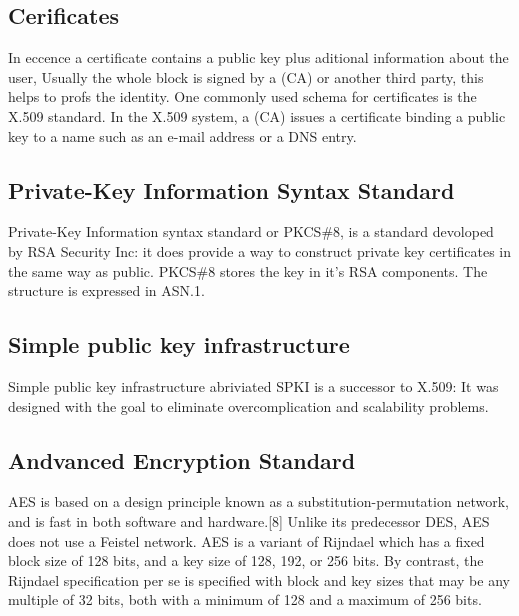\subsection{Cerificates} %
In eccence a certificate contains a public key plus aditional information about the user,
Usually the whole block is signed by a (CA) or another third party, this helps to profs the identity. One commonly used schema for certificates is the X.509 standard.
In the X.509 system, a (CA) issues a certificate binding a public key to a name such as an e-mail address or a DNS entry.

\subsection{Private-Key Information Syntax Standard}
Private-Key Information syntax standard or PKCS\#8, is a standard devoloped by RSA Security Inc: it does provide a way to construct private key certificates in the same way as public.
PKCS\#8 stores the key in it's RSA components.
The structure is expressed in ASN.1.
\subsection{Simple public key infrastructure}
Simple public key infrastructure abriviated SPKI is a successor to X.509:
It was designed with the goal to eliminate overcomplication and scalability problems.
\subsection{Andvanced Encryption Standard}
AES is based on a design principle known as a substitution-permutation network, and is fast in both software and hardware.[8] Unlike its predecessor DES, AES does not use a Feistel network. AES is a variant of Rijndael which has a fixed block size of 128 bits, and a key size of 128, 192, or 256 bits. By contrast, the Rijndael specification per se is specified with block and key sizes that may be any multiple of 32 bits, both with a minimum of 128 and a maximum of 256 bits.
\cite{AESISFAST:Online}

